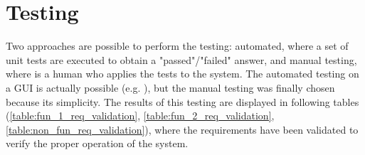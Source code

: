 \section{Testing}
\label{sec:testing}
Two approaches are possible to perform the testing: automated, where a set of unit tests are executed to obtain a "passed"/"failed" answer, and manual testing, where is a human who applies the tests to the system. The automated testing on a GUI is actually possible (e.g. \cite{maveryx_testing}), but the manual testing was finally chosen because its simplicity. The results of this testing are displayed in following tables (\ref{table:fun_1_req_validation}, \ref{table:fun_2_req_validation}, \ref{table:non_fun_req_validation}), where the requirements have been validated to verify the proper operation of the system.

\clearpage

